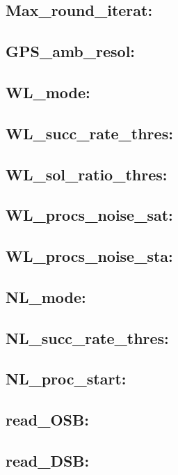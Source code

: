\subsection{Max\_round\_iterat:}

\subsection{GPS\_amb\_resol:}

\subsection{WL\_mode:}

\subsection{WL\_succ\_rate\_thres:}

\subsection{WL\_sol\_ratio\_thres:}

\subsection{WL\_procs\_noise\_sat:}

\subsection{WL\_procs\_noise\_sta:}

\subsection{NL\_mode:}

\subsection{NL\_succ\_rate\_thres:}

\subsection{NL\_proc\_start:}

\subsection{read\_OSB:}

\subsection{read\_DSB:}

